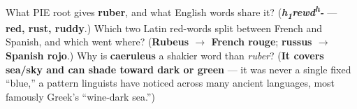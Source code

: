 \begin{tcolorbox}[breakable,colback=teal!4,colframe=teal!35!black,title={Before you move on}]
What PIE root gives \textbf{ruber}, and what English words share it? (\emph{\textbf{h\textsubscript{1}rewd\textsuperscript{h}-}} — \textbf{red, rust, ruddy}.) Which two Latin red-words split between French and Spanish, and which went where? (\textbf{Rubeus $\to$ French rouge}; \textbf{russus $\to$ Spanish rojo}.) Why is \textbf{caeruleus} a shakier word than \emph{ruber}? (\textbf{It covers sea/sky and can shade toward dark or green} — it was never a single fixed \textquotedblleft{}blue,\textquotedblright{} a pattern linguists have noticed across many ancient languages, most famously Greek's \textquotedblleft{}wine-dark sea.\textquotedblright{})
\end{tcolorbox}
